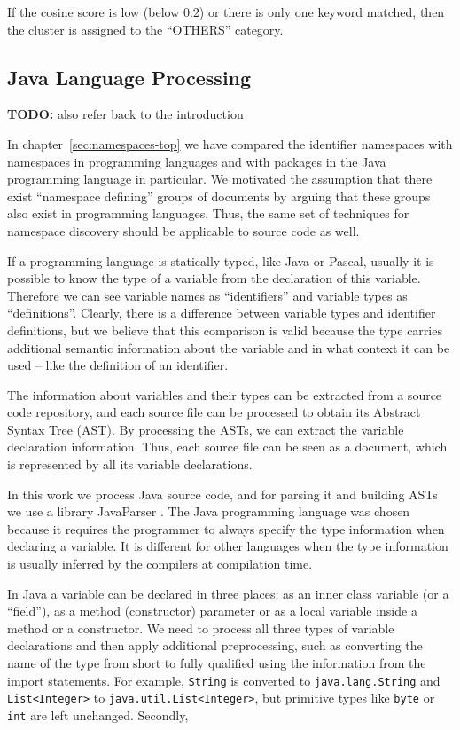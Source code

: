 If the cosine score is low (below $0.2$) or there is only one 
keyword matched, then the cluster is assigned to the ``OTHERS'' 
category.


\subsection{Java Language Processing} \label{sec:jlp}

\textbf{TODO:} also refer back to the introduction 

In chapter~\ref{sec:namespaces-top} we have compared the identifier namespaces
with namespaces in programming languages and with packages in the Java 
programming language in particular. We motivated the assumption that there 
exist ``namespace defining'' groups of documents by arguing that these 
groups also exist in programming languages. Thus, the same set of techniques
for namespace discovery should be applicable to source code as well. 

If a programming language is statically typed, like Java or Pascal, 
usually it is possible to know the type of a variable from the declaration
of this variable. Therefore we can see variable names as ``identifiers''
and variable types as ``definitions''. Clearly, there is a difference
between variable types and identifier definitions, but we believe
that this comparison is valid because the type carries additional semantic
information about the variable and in what context it can be used -- 
like the definition of an identifier.

The information about variables and their types can be extracted from a
source code repository, and each source file can be processed to 
obtain its Abstract Syntax Tree (AST). By processing the ASTs, 
we can extract the variable declaration information. Thus, each 
source file can be seen as a document, which is represented 
by all its variable declarations. 

In this work we process Java source code, and for parsing it 
and building ASTs we use a library JavaParser \cite{javaparser}.
The Java programming language was chosen because it requires the programmer 
to always specify the type information when declaring a variable. 
It is different for other languages when the type information is 
usually inferred by the compilers at compilation time. 


In Java a variable can be declared in three places: 
as an inner class variable (or a ``field''), as a method (constructor) 
parameter or as a local variable inside a method or a constructor.
We need to process all three types of variable declarations 
and then apply additional preprocessing, such as converting the name 
of the type from short to fully qualified using the information from the 
import statements. For example, \verb|String| is converted to 
\verb|java.lang.String| and \verb|List<Integer>| to \verb|java.util.List<Integer>|,
but primitive types like \verb|byte| or \verb|int| are left unchanged. 
Secondly, 


